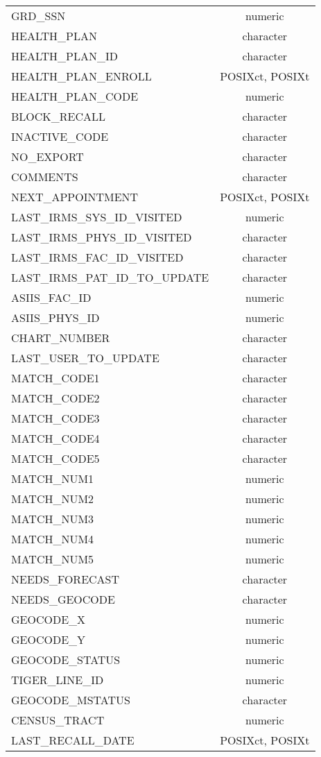 \documentclass[
  letterpaper,
  DIV=11,
  numbers=noendperiod]{scrreprt}
\begin{document}
\begin{longtable}{lc}
GRD\_SSN & numeric \\ 
HEALTH\_PLAN & character \\ 
HEALTH\_PLAN\_ID & character \\ 
HEALTH\_PLAN\_ENROLL & POSIXct, POSIXt \\ 
HEALTH\_PLAN\_CODE & numeric \\ 
BLOCK\_RECALL & character \\ 
INACTIVE\_CODE & character \\ 
NO\_EXPORT & character \\ 
COMMENTS & character \\ 
NEXT\_APPOINTMENT & POSIXct, POSIXt \\ 
LAST\_IRMS\_SYS\_ID\_VISITED & numeric \\ 
LAST\_IRMS\_PHYS\_ID\_VISITED & character \\ 
LAST\_IRMS\_FAC\_ID\_VISITED & character \\ 
LAST\_IRMS\_PAT\_ID\_TO\_UPDATE & character \\ 
ASIIS\_FAC\_ID & numeric \\ 
ASIIS\_PHYS\_ID & numeric \\ 
CHART\_NUMBER & character \\ 
LAST\_USER\_TO\_UPDATE & character \\ 
MATCH\_CODE1 & character \\ 
MATCH\_CODE2 & character \\ 
MATCH\_CODE3 & character \\ 
MATCH\_CODE4 & character \\ 
MATCH\_CODE5 & character \\ 
MATCH\_NUM1 & numeric \\ 
MATCH\_NUM2 & numeric \\ 
MATCH\_NUM3 & numeric \\ 
MATCH\_NUM4 & numeric \\ 
MATCH\_NUM5 & numeric \\ 
NEEDS\_FORECAST & character \\ 
NEEDS\_GEOCODE & character \\ 
GEOCODE\_X & numeric \\ 
GEOCODE\_Y & numeric \\ 
GEOCODE\_STATUS & numeric \\ 
TIGER\_LINE\_ID & numeric \\ 
GEOCODE\_MSTATUS & character \\ 
CENSUS\_TRACT & numeric \\ 
LAST\_RECALL\_DATE & POSIXct, POSIXt \\ 

\end{longtable}
\end{document}
